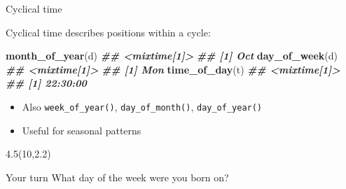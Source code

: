 \documentclass[
  14pt,
  ignorenonframetext,
  aspectratio=169,
]{beamer}
\newenvironment{Shaded}{\begin{snugshade}}{\end{snugshade}}
\newcommand{\DocumentationTok}[1]{\textcolor[rgb]{0.56,0.35,0.01}{\textbf{\textit{#1}}}}
\newcommand{\FunctionTok}[1]{\textcolor[rgb]{0.13,0.29,0.53}{\textbf{#1}}}
\newcommand{\NormalTok}[1]{#1}
\providecommand{\tightlist}{%
  \setlength{\itemsep}{0pt}\setlength{\parskip}{0pt}}
\renewenvironment{Shaded}{\vspace*{0.15cm}\color{black}\fontsize{10}{10}\sf\begin{snugshade}\color{black}}{\end{snugshade}}
\begin{document}
\begin{frame}[fragile]{Cyclical time}
\protect{}\label{cyclical-time}
\fontsize{11}{12}\sf

\alert{Cyclical time} describes positions within a cycle:

\begin{Shaded}
\begin{Highlighting}[]
\FunctionTok{month\_of\_year}\NormalTok{(d)}
\DocumentationTok{\#\# \textless{}mixtime[1]\textgreater{}}
\DocumentationTok{\#\# [1] Oct}
\FunctionTok{day\_of\_week}\NormalTok{(d)}
\DocumentationTok{\#\# \textless{}mixtime[1]\textgreater{}}
\DocumentationTok{\#\# [1] Mon}
\FunctionTok{time\_of\_day}\NormalTok{(t)}
\DocumentationTok{\#\# \textless{}mixtime[1]\textgreater{}}
\DocumentationTok{\#\# [1] 22:30:00}
\end{Highlighting}
\end{Shaded}

\pause

\begin{itemize}
\tightlist
\item
  Also \texttt{week\_of\_year()}, \texttt{day\_of\_month()},
  \texttt{day\_of\_year()}
\item
  Useful for seasonal patterns
\end{itemize}

\pause

\begin{textblock}{4.5}(10,2.2)
\begin{alertblock}{Your turn}
What day of the week were you born on?
\end{alertblock}
\end{textblock}
\end{frame}
\end{document}
